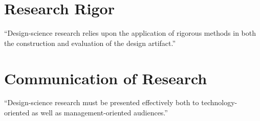 \section{Research Rigor}
``Design-science research relies upon the application of rigorous methods in both the construction and evaluation of the design artifact.''



\section{Communication of Research}
``Design-science research must be presented effectively both to technology-oriented as well as management-oriented audiences.''
